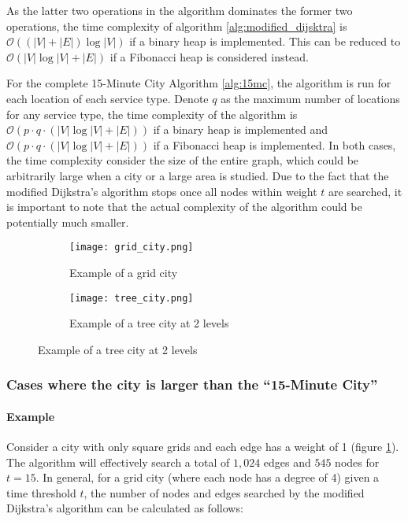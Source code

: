 As the latter two operations in the algorithm dominates the former two operations, the time complexity of algorithm \ref{alg:modified_dijsktra} is $\mathcal{O}((|V|+|E|)\log |V|)$ if a binary heap is implemented. This can be reduced to $\mathcal{O}(|V|\log |V|+|E|)$ if a Fibonacci heap is considered instead.

For the complete 15-Minute City Algorithm \ref{alg:15mc}, the algorithm is run for each location of each service type. Denote $q$ as the maximum number of locations for any service type, the time complexity of the algorithm is $\mathcal{O}(p\cdot q\cdot(|V|\log |V|+|E|))$ if a binary heap is implemented and $\mathcal{O}(p\cdot q\cdot(|V|\log |V|+|E|))$ if a Fibonacci heap is implemented. In both cases, the time complexity consider the size of the entire graph, which could be arbitrarily large when a city or a large area is studied. Due to the fact that the modified Dijkstra's algorithm stops once all nodes within weight $t$ are searched, it is important to note that the actual complexity of the algorithm could be potentially much smaller.

\begin{figure}[H]
    \centering
    \begin{subfigure}{0.5\textwidth}
        \centering
        \texttt{[image: grid\_city.png]}
        \caption{Example of a grid city}
        \label{fig:grid_city}
    \end{subfigure}\hfill
    \begin{subfigure}{0.5\textwidth}
        \centering
        \texttt{[image: tree\_city.png]}
        \caption{Example of a tree city at 2 levels}
        \label{fig:tree_city}
    \end{subfigure}
\end{figure}

\subsubsection{Cases where the city is larger than the ``15-Minute City''}

\paragraph{Example}

Consider a city with only square grids and each edge has a weight of 1 (figure \ref{fig:grid_city}). The algorithm will effectively search a total of $1,024$ edges and $545$ nodes for $t=15$. In general, for a grid city (where each node has a degree of 4) given a time threshold $t$, the number of nodes and edges searched by the modified Dijkstra's algorithm can be calculated as follows:

